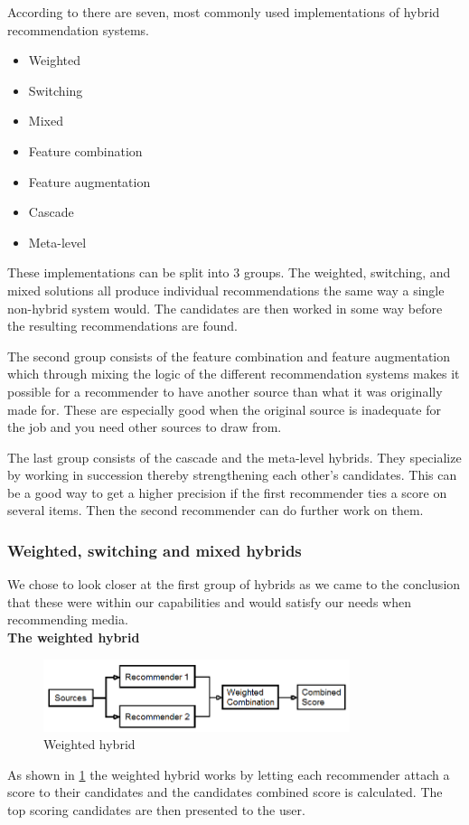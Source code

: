 According to \cite{TheAdaptiveWeb} there are seven, most commonly used implementations of hybrid recommendation systems. 

\begin{itemize}
\item Weighted
\item Switching
\item Mixed
\item Feature combination
\item Feature augmentation
\item Cascade
\item Meta-level
\end{itemize}

These implementations can be split into 3 groups. The weighted, switching, and mixed solutions all produce individual recommendations the same way a single non-hybrid system would. The candidates are then worked in some way before the resulting recommendations are found.

The second group consists of the feature combination and feature augmentation which through mixing the logic of the different recommendation systems makes it possible for a recommender to have another source than what it was originally made for. These are especially good when the original source is inadequate for the job and you need other sources to draw from.

The last group consists of the cascade and the meta-level hybrids. They specialize by working in succession thereby strengthening each other's candidates. This can be a good way to get a higher precision if the first recommender ties a score on several items. Then the second recommender can do further work on them. 

\subsubsection{Weighted, switching and mixed hybrids} 
We chose to look closer at the first group of hybrids as we came to the conclusion that these were within our capabilities and would satisfy our needs when recommending media.\\

\textbf{The weighted hybrid}

\begin{figure}[H]
\centering
\includegraphics[width=0.8\textwidth]{Images/Weightedhybrid.png}
\caption{Weighted hybrid}
\label{Weighted}
\end{figure}
As shown in \ref{Weighted} the weighted hybrid works by letting each recommender attach a score to their candidates and the candidates combined score is calculated. The top scoring candidates are then presented to the user. \\

